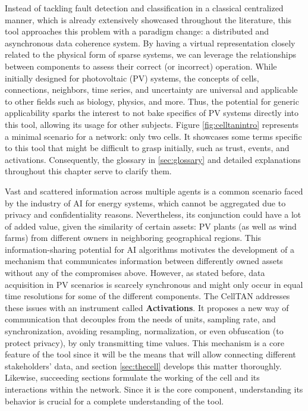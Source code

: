 Instead of tackling fault detection and classification in a classical centralized manner, which is already extensively showcased throughout the literature, this tool approaches this problem with a paradigm change: a distributed and asynchronous data coherence system. By having a virtual representation closely related to the physical form of sparse systems, we can leverage the relationships between components to assess their correct (or incorrect) operation. While initially designed for photovoltaic (PV) systems, the concepts of cells, connections, neighbors, time series, and uncertainty are universal and applicable to other fields such as biology, physics, and more. Thus, the potential for generic applicability sparks the interest to not bake specifics of PV systems directly into this tool, allowing its usage for other subjects. Figure \ref{fig:celltanintro} represents a minimal scenario for a network: only two cells. It showcases some terms specific to this tool that might be difficult to grasp initially, such as trust, events, and activations. Consequently, the glossary in \ref{sec:glossary} and detailed explanations throughout this chapter serve to clarify them.

Vast and scattered information across multiple agents is a common scenario faced by the industry of AI for energy systems, which cannot be aggregated due to privacy and confidentiality reasons. Nevertheless, its conjunction could have a lot of added value, given the similarity of certain assets: PV plants (as well as wind farms) from different owners in neighboring geographical regions. This information-sharing potential for AI algorithms motivates the development of a mechanism that communicates information between differently owned assets without any of the compromises above. However, as stated before, data acquisition in PV scenarios is scarcely synchronous and might only occur in equal time resolutions for some of the different components. The CellTAN addresses these issues with an instrument called \textbf{Activations}. It proposes a new way of communication that decouples from the needs of units, sampling rate, and synchronization, avoiding resampling, normalization, or even obfuscation (to protect privacy), by only transmitting time values. This mechanism is a core feature of the tool since it will be the means that will allow connecting different stakeholders' data, and section \ref{sec:thecell} develops this matter thoroughly. Likewise, succeeding sections formulate the working of the cell and its interactions within the network. Since it is the core component, understanding its behavior is crucial for a complete understanding of the tool.

